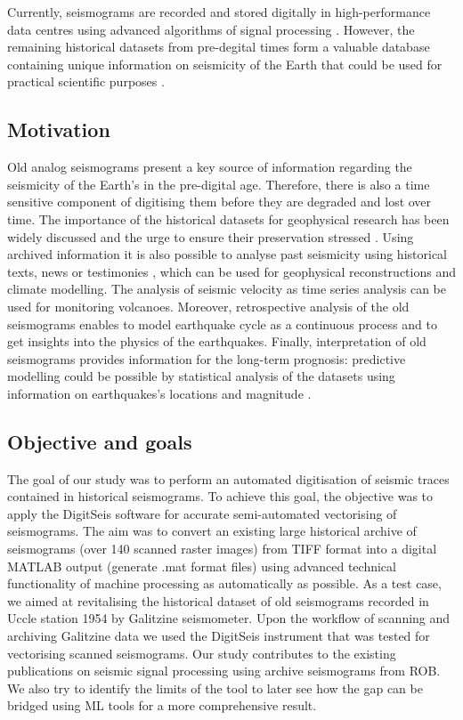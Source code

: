 \documentclass[sensors,article,submit,moreauthors,pdftex]{Definitions/mdpi}
\begin{document}
Currently, seismograms are recorded and stored digitally in high-performance data centres using advanced algorithms of signal processing \cite{Heiner}. However, the remaining historical datasets from pre-degital times form a valuable database containing unique information on seismicity of the Earth that could be used for practical scientific purposes \cite{Kanamorietal2010,Bungum,Kanamorietal2019,Lomnitz2004,Ambraseys1983}. 

\subsection{Motivation}
Old analog seismograms present a key source of information regarding the seismicity of the Earth's in the pre-digital age. Therefore, there is also a time sensitive component of digitising them before they are degraded and lost over time. The importance of the historical datasets for geophysical research has been widely discussed \cite{Vogtetal1985, TevesCosta1999,Bono2007,Okal} and the urge to ensure their preservation stressed \cite{Okal}. Using archived information it is also possible to analyse past seismicity using historical texts, news or testimonies \cite{Alexandre1990a,Alexandre1985,Alexandre1990b}, which can be used for geophysical reconstructions and climate modelling. The analysis of seismic velocity as time series analysis can be used for monitoring volcanoes. Moreover, retrospective analysis of the old seismograms enables to model earthquake cycle as a continuous process and to get insights into the physics of the earthquakes. Finally, interpretation of old seismograms provides information for the long-term prognosis: predictive modelling could be possible by statistical analysis of the datasets using information on earthquakes's locations and magnitude \cite{Kanamori1988}.

\subsection{Objective and goals}
The goal of our study was to perform an automated digitisation of seismic traces contained in historical seismograms. To achieve this goal, the objective was to apply the DigitSeis software for accurate semi-automated vectorising of seismograms. The aim was to convert an existing large historical archive of seismograms (over 140 scanned raster images) from TIFF format into a digital MATLAB output (generate .mat format files) using advanced technical functionality of machine processing as automatically as possible. As a test case, we aimed at revitalising the historical dataset of old seismograms recorded in Uccle station 1954 by Galitzine seismometer. Upon the workflow of scanning and archiving Galitzine data we used the DigitSeis instrument that was  tested for vectorising scanned seismograms. Our study contributes to the existing publications on seismic signal processing using archive seismograms from \ac{ROB}. We also try to identify the limits of the tool to later see how the gap can be bridged using ML tools for a more comprehensive result.
\end{document}
